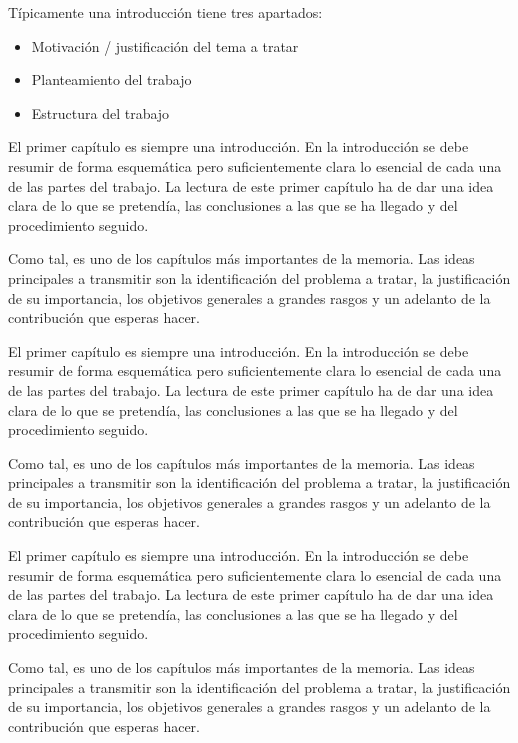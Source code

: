 \documentclass[11pt,a4paper,spanish]{book}
\begin{document}
Típicamente una introducción tiene tres apartados:
\begin{itemize}
\item Motivación / justificación del tema a tratar
\item Planteamiento del trabajo
\item Estructura del trabajo
\end{itemize}


El primer capítulo es siempre una introducción. En la introducción se debe resumir de forma esquemática pero suficientemente clara lo esencial de cada una de las partes del trabajo. La lectura de este primer capítulo ha de dar una idea clara de lo que se pretendía, las conclusiones a las que se ha llegado y del procedimiento seguido.

Como tal, es uno de los capítulos más importantes de la memoria. Las ideas principales a transmitir son la identificación del problema a tratar, la justificación de su importancia, los objetivos generales a grandes rasgos y un adelanto de la contribución que esperas hacer.



El primer capítulo es siempre una introducción. En la introducción se debe resumir de forma esquemática pero suficientemente clara lo esencial de cada una de las partes del trabajo. La lectura de este primer capítulo ha de dar una idea clara de lo que se pretendía, las conclusiones a las que se ha llegado y del procedimiento seguido.

Como tal, es uno de los capítulos más importantes de la memoria. Las ideas principales a transmitir son la identificación del problema a tratar, la justificación de su importancia, los objetivos generales a grandes rasgos y un adelanto de la contribución que esperas hacer.



El primer capítulo es siempre una introducción. En la introducción se debe resumir de forma esquemática pero suficientemente clara lo esencial de cada una de las partes del trabajo. La lectura de este primer capítulo ha de dar una idea clara de lo que se pretendía, las conclusiones a las que se ha llegado y del procedimiento seguido.

Como tal, es uno de los capítulos más importantes de la memoria. Las ideas principales a transmitir son la identificación del problema a tratar, la justificación de su importancia, los objetivos generales a grandes rasgos y un adelanto de la contribución que esperas hacer.
\end{document}
